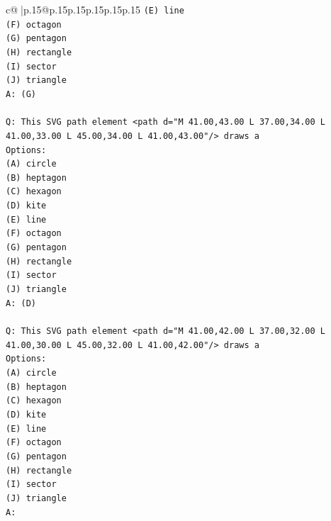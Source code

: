 \documentclass{article}
\begin{document}
{\begin{supertabular}{c@{$\;$}|p{.15\linewidth}@{}p{.15\linewidth}p{.15\linewidth}p{.15\linewidth}p{.15\linewidth}p{.15\linewidth}}
{{{\texttt{(E) line} \\
\texttt{(F) octagon} \\
\texttt{(G) pentagon} \\
\texttt{(H) rectangle} \\
\texttt{(I) sector} \\
\texttt{(J) triangle} \\
\texttt{A: (G)} \\
\\ 
\texttt{Q: This SVG path element <path d="M 41.00,43.00 L 37.00,34.00 L 41.00,33.00 L 45.00,34.00 L 41.00,43.00"/> draws a} \\
\texttt{Options:} \\
\texttt{(A) circle} \\
\texttt{(B) heptagon} \\
\texttt{(C) hexagon} \\
\texttt{(D) kite} \\
\texttt{(E) line} \\
\texttt{(F) octagon} \\
\texttt{(G) pentagon} \\
\texttt{(H) rectangle} \\
\texttt{(I) sector} \\
\texttt{(J) triangle} \\
\texttt{A: (D)} \\
\\ 
\texttt{Q: This SVG path element <path d="M 41.00,42.00 L 37.00,32.00 L 41.00,30.00 L 45.00,32.00 L 41.00,42.00"/> draws a} \\
\texttt{Options:} \\
\texttt{(A) circle} \\
\texttt{(B) heptagon} \\
\texttt{(C) hexagon} \\
\texttt{(D) kite} \\
\texttt{(E) line} \\
\texttt{(F) octagon} \\
\texttt{(G) pentagon} \\
\texttt{(H) rectangle} \\
\texttt{(I) sector} \\
\texttt{(J) triangle} \\
\texttt{A:} \\
            }
        }
    }
     \\ \\


\end{supertabular}}
\end{document}
